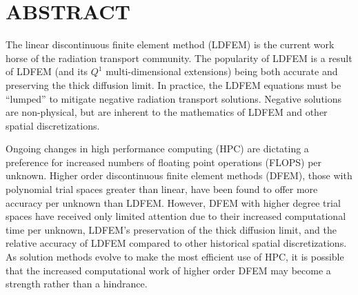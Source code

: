 %
%
%

\chapter*{ABSTRACT}

\pagestyle{plain} %
\setcounter{page}{2}

\indent The linear discontinuous finite element method (LDFEM) is the current work horse of the radiation transport community.  
The popularity of LDFEM is a result of LDFEM (and its $Q^1$ multi-dimensional extensions) being both accurate and preserving the thick diffusion limit.
In practice, the LDFEM equations must be ``lumped'' to mitigate negative radiation transport solutions.
Negative solutions are non-physical, but are inherent to the mathematics of LDFEM and other spatial discretizations.

Ongoing changes in high performance computing (HPC) are dictating a preference for increased numbers of floating point operations (FLOPS) per unknown.
Higher order discontinuous finite element methods (DFEM), those with polynomial trial spaces greater than linear, have been found to offer more accuracy per unknown than LDFEM.
However, DFEM with higher degree trial spaces have received only limited attention due to their increased computational time per unknown, LDFEM's preservation of the thick diffusion limit, and the relative accuracy of LDFEM compared to other historical spatial discretizations.
As solution methods evolve to make the most efficient use of HPC, it is possible that the increased computational work of higher order DFEM may become a strength rather than a hindrance.

